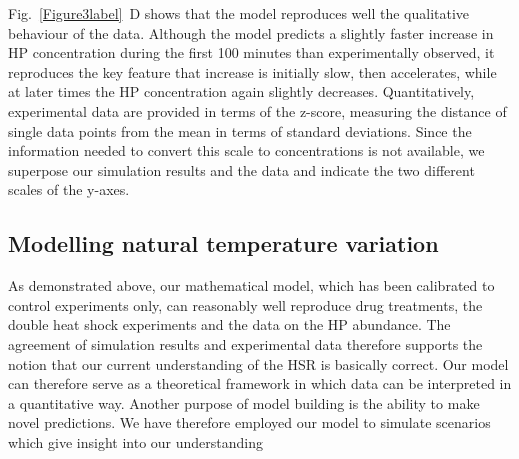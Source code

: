 \documentclass[oneside, 10pt, a4paper, twocolumn]{article}
\begin{document}
Fig.~\ref{Figure3label}~D shows that the model reproduces well the qualitative behaviour of the data.
Although the model predicts a slightly faster increase in HP concentration during the first
100 minutes than experimentally observed, it reproduces the key feature that increase is initially slow,
then accelerates, while at later times the HP concentration again slightly decreases. 
Quantitatively, experimental data are provided in terms of the z-score, 
measuring the distance of single data points from the mean in terms of standard deviations. 
Since the information needed to convert this scale to concentrations is not available, 
we superpose our simulation results and the data and  indicate the two different  scales of the y-axes. %





\subsection{Modelling natural temperature variation}
\label{SecHotDay}
\label{MaximalHPtau}

As demonstrated above, our mathematical model, which has been calibrated to control experiments only, 
can reasonably well reproduce drug treatments, the double heat shock experiments and the data on the HP abundance.
The agreement of simulation results and experimental data therefore supports the notion that our current understanding of the HSR is basically correct. Our model can therefore serve as a theoretical framework in which
data can be interpreted in a quantitative way.
Another purpose of model building is the ability to make novel predictions.
We have therefore employed our model to simulate scenarios which give insight into our understanding
\end{document}

